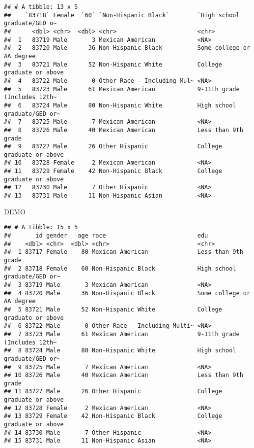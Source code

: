 \documentclass[
]{book}
\newenvironment{Shaded}{\begin{snugshade}}{\end{snugshade}}
\newcommand{\NormalTok}[1]{#1}
\begin{document}
\begin{verbatim}
## # A tibble: 13 x 5
##    `83718` Female  `60` `Non-Hispanic Black`        `High school graduate/GED o~
##      <dbl> <chr>  <dbl> <chr>                       <chr>                       
##  1   83719 Male       3 Mexican American            <NA>                        
##  2   83720 Male      36 Non-Hispanic Black          Some college or AA degree   
##  3   83721 Male      52 Non-Hispanic White          College graduate or above   
##  4   83722 Male       0 Other Race - Including Mul~ <NA>                        
##  5   83723 Male      61 Mexican American            9-11th grade (Includes 12th~
##  6   83724 Male      80 Non-Hispanic White          High school graduate/GED or~
##  7   83725 Male       7 Mexican American            <NA>                        
##  8   83726 Male      40 Mexican American            Less than 9th grade         
##  9   83727 Male      26 Other Hispanic              College graduate or above   
## 10   83728 Female     2 Mexican American            <NA>                        
## 11   83729 Female    42 Non-Hispanic Black          College graduate or above   
## 12   83730 Male       7 Other Hispanic              <NA>                        
## 13   83731 Male      11 Non-Hispanic Asian          <NA>
\end{verbatim}

\begin{Shaded}
\begin{Highlighting}[]
\NormalTok{DEMO}
\end{Highlighting}
\end{Shaded}

\begin{verbatim}
## # A tibble: 15 x 5
##       id gender   age race                          edu                         
##    <dbl> <chr>  <dbl> <chr>                         <chr>                       
##  1 83717 Female    80 Mexican American              Less than 9th grade         
##  2 83718 Female    60 Non-Hispanic Black            High school graduate/GED or~
##  3 83719 Male       3 Mexican American              <NA>                        
##  4 83720 Male      36 Non-Hispanic Black            Some college or AA degree   
##  5 83721 Male      52 Non-Hispanic White            College graduate or above   
##  6 83722 Male       0 Other Race - Including Multi~ <NA>                        
##  7 83723 Male      61 Mexican American              9-11th grade (Includes 12th~
##  8 83724 Male      80 Non-Hispanic White            High school graduate/GED or~
##  9 83725 Male       7 Mexican American              <NA>                        
## 10 83726 Male      40 Mexican American              Less than 9th grade         
## 11 83727 Male      26 Other Hispanic                College graduate or above   
## 12 83728 Female     2 Mexican American              <NA>                        
## 13 83729 Female    42 Non-Hispanic Black            College graduate or above   
## 14 83730 Male       7 Other Hispanic                <NA>                        
## 15 83731 Male      11 Non-Hispanic Asian            <NA>
\end{verbatim}
\end{document}

